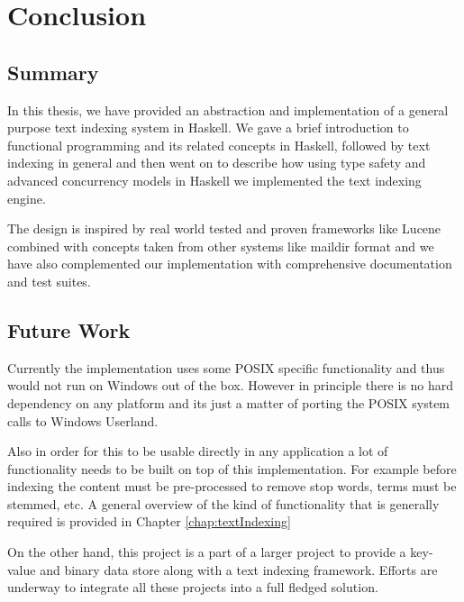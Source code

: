 \chapter{Conclusion}
\label{chap:conclusion}

\section {Summary}
In this thesis, we have provided an abstraction and implementation of a general purpose text indexing system in Haskell.
We gave a brief introduction to functional programming and its related concepts in Haskell,
followed by text indexing in general and then went on to describe how using type safety and advanced concurrency models in Haskell
we implemented the text indexing engine.

The design is inspired by real world tested and proven frameworks like Lucene combined with concepts taken from other systems like maildir format\cite{bernsteinMaildir}
and we have also complemented our implementation with comprehensive documentation and test suites.

\section{Future Work}
Currently the implementation uses some POSIX specific functionality and thus would not run on Windows out of the box.
However in principle there is no hard dependency on any platform and its just a matter of porting the POSIX system calls to Windows Userland.

Also in order for this to be usable directly in any application a lot of functionality needs to be built on top of this implementation.
For example before indexing the content must be pre-processed to remove stop words, terms must be stemmed, etc.
A general overview of the kind of functionality that is generally required is provided in Chapter \ref{chap:textIndexing}

On the other hand, this project is a part of a larger project to provide a key-value and binary data store along with a text indexing framework.
Efforts are underway to integrate all these projects into a full fledged solution.

